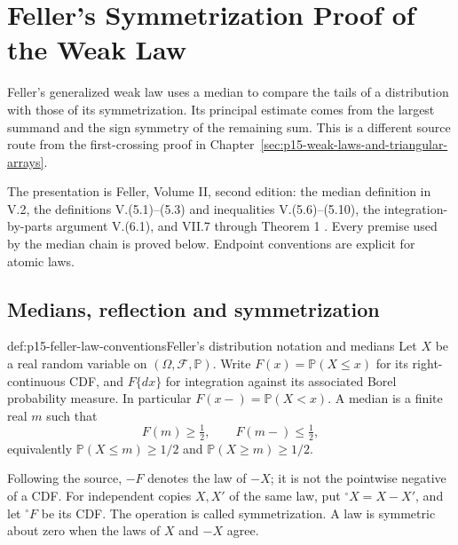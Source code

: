 \chapter{Feller's Symmetrization Proof of the Weak Law}
\label{sec:p15-feller-weak-law-presentation}

Feller's generalized weak law uses a median to compare the tails of a
distribution with those of its symmetrization. Its principal estimate
comes from the largest summand and the sign symmetry of the remaining
sum. This is a different source route from the first-crossing proof in
Chapter~\ref{sec:p15-weak-laws-and-triangular-arrays}.

The presentation is Feller, Volume II, second edition: the median
definition in V.2, the definitions V.(5.1)--(5.3) and inequalities
V.(5.6)--(5.10),
the integration-by-parts argument V.(6.1), and VII.7 through Theorem 1
\cite[pp.~137, 148--150, 234--236]{Feller1971ProbabilityII}.
Every premise used by the median chain is proved below. Endpoint
conventions are explicit for atomic laws.

\section{Medians, reflection and symmetrization}
\label{sec:p15-feller-median-symmetrization}

\begin{hbdefinition}{def:p15-feller-law-conventions}{Feller's distribution notation and medians}
Let \(X\) be a real random variable on
\((\Omega,\mathcal F,\mathbb P)\). Write
\(F(x)=\mathbb P(X\leq x)\) for its right-continuous CDF,
and \(F\{dx\}\) for integration against its associated Borel
probability measure. In particular
\(F(x-)=\mathbb P(X<x)\).
A median is a finite real \(m\) such that
\[
 F(m)\geq\tfrac12,\qquad F(m-)\leq\tfrac12,
\]
equivalently \(\mathbb P(X\leq m)\geq1/2\) and
\(\mathbb P(X\geq m)\geq1/2\).

Following the source, \(-F\) denotes the law of \(-X\); it is
not the pointwise negative of a CDF. For independent copies \(X,X'\)
of the same law, put
\({}^{\circ}X=X-X'\), and let \({}^{\circ}F\) be its CDF.
The operation is called symmetrization. A law is symmetric about zero
when the laws of \(X\) and \(-X\) agree.
\end{hbdefinition}

